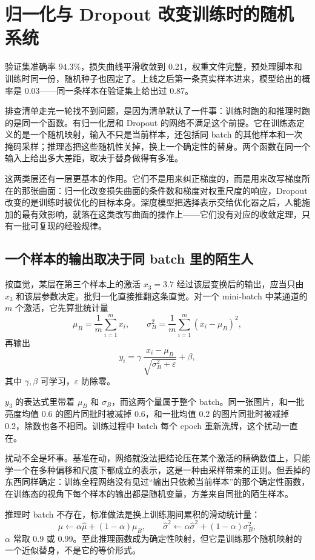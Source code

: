 \section{归一化与 Dropout 改变训练时的随机系统}
\label{sec:14-Deep-Learning/03-Optimization-and-Training/03}

验证集准确率 \(94.3\%\)，损失曲线平滑收敛到 0.21，权重文件完整，预处理脚本和训练时同一份，随机种子也固定了。上线之后第一条真实样本进来，模型给出的概率是 0.03——同一条样本在验证集上给出过 0.87。

排查清单走完一轮找不到问题，是因为清单默认了一件事：训练时跑的和推理时跑的是同一个函数。有归一化层和 Dropout 的网络不满足这个前提。它在训练态定义的是一个随机映射，输入不只是当前样本，还包括同 batch 的其他样本和一次掩码采样；推理态把这些随机性关掉，换上一个确定性的替身。两个函数在同一个输入上给出多大差距，取决于替身做得有多准。

这两类层还有一层更基本的作用。它们不是用来纠正梯度的，而是用来改写梯度所在的那张曲面：归一化改变损失曲面的条件数和梯度对权重尺度的响应，Dropout 改变的是训练时被优化的目标本身。深度模型把选择表示交给优化器之后，人能施加的最有效影响，就落在这类改写曲面的操作上——它们没有对应的收敛定理，只有一批可复现的经验规律。

\subsection{一个样本的输出取决于同 batch 里的陌生人}

按直觉，某层在第三个样本上的激活 \(x_3=3.7\) 经过该层变换后的输出，应当只由 \(x_3\) 和该层参数决定。批归一化直接推翻这条直觉。对一个 mini-batch 中某通道的 \(m\) 个激活，它先算批统计量
\[
\mu_B=\frac1m\sum_{i=1}^m x_i,\qquad
\sigma_B^2=\frac1m\sum_{i=1}^m(x_i-\mu_B)^2,
\]
再输出
\[
y_i=\gamma\,\frac{x_i-\mu_B}{\sqrt{\sigma_B^2+\varepsilon}}+\beta,
\]
其中 \(\gamma,\beta\) 可学习，\(\varepsilon\) 防除零。

\(y_3\) 的表达式里带着 \(\mu_B\) 和 \(\sigma_B\)，而这两个量属于整个 batch。同一张图片，和一批亮度均值 0.6 的图片同批时被减掉 0.6，和一批均值 0.2 的图片同批时被减掉 0.2，除数也各不相同。训练过程中 batch 每个 epoch 重新洗牌，这个扰动一直在。

扰动不全是坏事。基准在动，网络就没法把结论压在某个激活的精确数值上，只能学一个在多种偏移和尺度下都成立的表示，这是一种由采样带来的正则。但丢掉的东西同样确定：训练全程网络没有见过``输出只依赖当前样本''的那个确定性函数，在训练态的视角下每个样本的输出都是随机变量，方差来自同批的陌生样本。

推理时 batch 不存在，标准做法是换上训练期间累积的滑动统计量：
\[
\widehat\mu\leftarrow\alpha\widehat\mu+(1-\alpha)\mu_B,\qquad
\widehat\sigma^2\leftarrow\alpha\widehat\sigma^2+(1-\alpha)\sigma_B^2,
\]
\(\alpha\) 常取 0.9 或 0.99。至此推理函数成为确定性映射，但它是训练那个随机映射的一个近似替身，不是它的等价形式。

